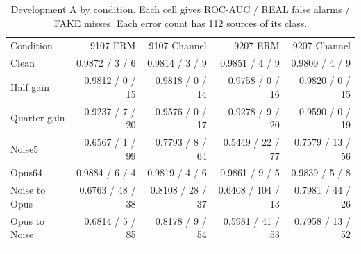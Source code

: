 \begin{table}[t]
\caption{Development A by condition. Each cell gives ROC-AUC / REAL false alarms / FAKE misses. Each error count has 112 sources of its class.}\label{tab:conditions}
\centering
\begin{tabular}{@{}lrrrr@{}}
\toprule
Condition & 9107 ERM & 9107 Channel & 9207 ERM & 9207 Channel \\
\colrule
Clean & 0.9872 / 3 / 6 & 0.9814 / 3 / 9 & 0.9851 / 4 / 9 & 0.9809 / 4 / 9 \\
Half gain & 0.9812 / 0 / 15 & 0.9818 / 0 / 14 & 0.9758 / 0 / 16 & 0.9820 / 0 / 15 \\
Quarter gain & 0.9237 / 7 / 20 & 0.9576 / 0 / 17 & 0.9278 / 9 / 20 & 0.9590 / 0 / 19 \\
Noise5 & 0.6567 / 1 / 99 & 0.7793 / 8 / 64 & 0.5449 / 22 / 77 & 0.7579 / 13 / 56 \\
Opus64 & 0.9884 / 6 / 4 & 0.9819 / 4 / 6 & 0.9861 / 9 / 5 & 0.9839 / 5 / 8 \\
Noise to Opus & 0.6763 / 48 / 38 & 0.8108 / 28 / 37 & 0.6408 / 104 / 13 & 0.7981 / 44 / 26 \\
Opus to Noise & 0.6814 / 5 / 85 & 0.8178 / 9 / 54 & 0.5981 / 41 / 53 & 0.7958 / 13 / 52 \\
\botrule
\end{tabular}
\end{table}
